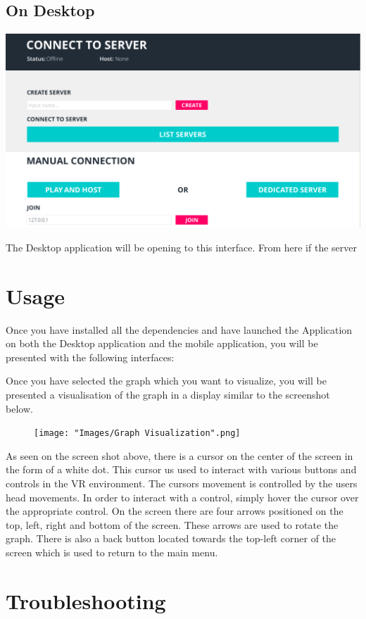 \documentclass[english]{article}
\begin{document}
\subsection{On Desktop}
\includegraphics[scale=0.4]{deskInteraction.png}

The Desktop application will be opening to this interface. From here if the server 

\section{Usage} 
\begin{flushleft}
Once you have installed all the dependencies and have launched the Application on both the Desktop application and the mobile application, you will be presented with the following interfaces:

Once you have selected the graph which you want to visualize, you will be presented a visualisation of the graph in a display similar to the screenshot below.
\end{flushleft}
    
\begin{figure}
  \centering
  \texttt{[image: "Images/Graph Visualization".png]}
\end{figure}

\begin{flushleft}
As seen on the screen shot above, there is a cursor on the center of the screen in the form of a white dot. This cursor us used to interact with various buttons and controls in the VR environment. The cursors movement is controlled by the users head movements. In order to interact with a control, simply hover the cursor over the appropriate control. On the screen there are four arrows positioned on the top, left, right and bottom of the screen. These arrows are used to rotate the graph. There is also a back button located towards the top-left corner of the screen which is used to return to the main menu.
\end{flushleft}
\section{Troubleshooting}
\end{document}
